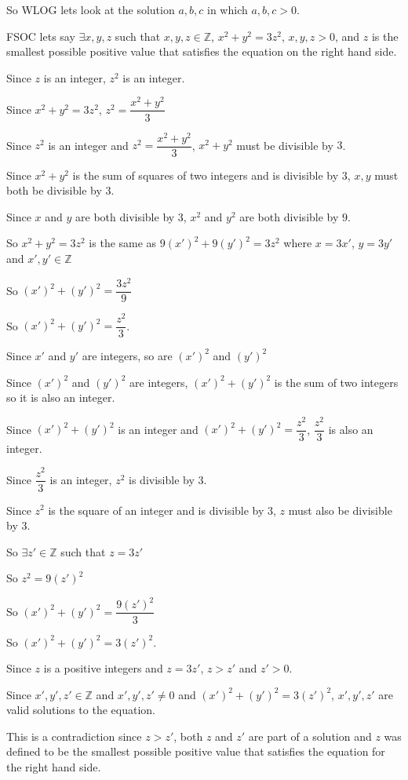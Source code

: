 \documentclass[letterpaper, 11pt]{article}
\begin{document}
So WLOG lets look at the solution $a, b, c$ in which $a, b, c > 0$.

FSOC lets say $\exists x, y, z$ such that $x, y, z \in \mathbb{Z}$, $x^2 + y^2 = 3z^2$, $x,y,z > 0$, and $z$ is the smallest possible positive value that satisfies the equation on the right hand side.

Since $z$ is an integer, $z^2$ is an integer.

Since $x^2 + y^2 = 3z^2$, $z^2 = \dfrac{x^2 + y^2}{3}$

Since $z^2$ is an integer and $z^2 = \dfrac{x^2 + y^2}{3}$, $x^2 + y^2$ must be divisible by $3$.

Since $x^2 + y^2$ is the sum of squares of two integers and is divisible by $3$, $x, y$ must both be divisible by $3$.

Since $x$ and $y$ are both divisible by $3$, $x^2$ and $y^2$ are both divisible by $9$.

So $x^2 + y^2 = 3z^2$ is the same as $9(x')^2 + 9(y')^2 = 3z^2$ where $x = 3x'$, $y = 3y'$ and $x', y' \in \mathbb{Z}$

So $(x')^2 + (y')^2 = \dfrac{3z^2}{9}$

So $(x')^2 + (y')^2 = \dfrac{z^2}{3}$.

Since $x'$ and $y'$ are integers, so are $(x')^2$ and $(y')^2$

Since $(x')^2$ and $(y')^2$ are integers, $(x')^2 + (y')^2$ is the sum of two integers so it is also an integer.

Since $(x')^2 + (y')^2$ is an integer and $(x')^2 + (y')^2 = \dfrac{z^2}{3}$, $\dfrac{z^2}{3}$ is also an integer.

Since $\dfrac{z^2}{3}$ is an integer, $z^2$ is divisible by $3$.

Since $z^2$ is the square of an integer and is divisible by $3$, $z$ must also be divisible by $3$.

So $\exists z' \in \mathbb{Z}$ such that $z = 3z'$

So $z^2 = 9(z')^2$

So $(x')^2 + (y')^2 = \dfrac{9(z')^2}{3}$

So $(x')^2 + (y')^2 = 3(z')^2$.

Since $z$ is a positive integers and $z = 3z'$, $z > z'$ and $z' > 0$.

Since $x', y', z' \in \mathbb{Z}$ and $x', y', z' \neq 0$ and $(x')^2 + (y')^2 = 3(z')^2$, $x', y', z'$ are valid solutions to the equation.

This is a contradiction since $z > z'$, both $z$ and $z'$ are part of a solution and $z$ was defined to be the smallest possible positive value that satisfies the equation for the right hand side.
\end{document}
